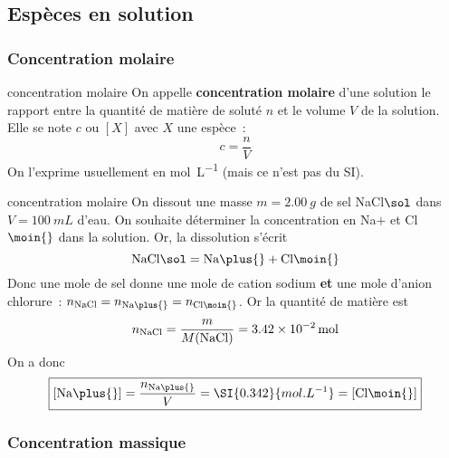 \documentclass[../main/main.tex]{subfiles}
\begin{document}
\subsection{Espèces en solution}
\subsubsection{Concentration molaire}

\begin{tcbraster}[raster columns=2, raster equal height=rows]
    \begin{defi}[label=def:cmol]{concentration molaire}
        On appelle \textbf{concentration molaire} d'une solution le
        rapport entre la quantité de matière de soluté $n$ et le volume $V$ de
        la solution. Elle se note $c$ ou $[X]$ avec $X$ une espèce~:
        \[c = \frac{n}{V}\]
        On l'exprime usuellement en \si{mol.L^{-1}} (mais ce n'est pas du SI).
    \end{defi}
    \begin{exem}[label=exem:cmol]{concentration molaire}
        On dissout une masse $m = \SI{2.00}{g}$ de sel NaCl$\sol$ dans $V =
        \SI{100}{mL}$ d'eau. On souhaite déterminer la concentration en
        Na$\plus{}$ et Cl$\moin{}$ dans la solution. Or, la dissolution s'écrit
        \[{\rm NaCl}\sol = {\rm Na}\plus{} + {\rm Cl}\moin{}\]
        Donc une mole de sel donne une mole de cation sodium \textbf{et} une
        mole d'anion chlorure~: $n_{\rm NaCl} = n_{\rm Na\plus{}} = n_{\rm
        Cl\moin{}}$. Or la quantité de matière est
        \[n_{\rm NaCl} = \frac{m}{M({\rm NaCl})} = \SI{3.42e-2}{mol}\]
        On a donc
        \begin{equation*}
            \boxed{ \left[ {\rm Na}\plus{} \right] = \frac{n_{\rm Na\plus{}}}{V} =
            \SI{0.342}{mol.L^{-1}} = \left[ {\rm Cl}\moin{} \right]}
        \end{equation*}
    \end{exem}
\end{tcbraster}

\subsubsection{Concentration massique}
\end{document}
